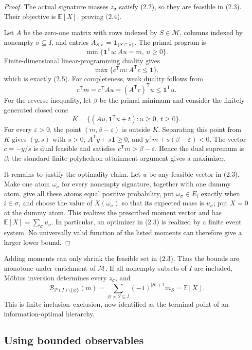 \documentclass[11pt]{article}
\theoremstyle{definition}
\theoremstyle{remark}
\newcommand{\E}{\mathbb E}
\newcommand{\one}{\mathbf 1}
\newcommand{\cP}{\mathcal P}
\newcommand{\cM}{\mathcal M}
\newcommand{\cB}{\mathcal B}
\begin{document}
\begin{proof}
The actual signature masses $z_\sigma$ satisfy (2.2), so they are feasible
in (2.3).  Their objective is $\E[X]$, proving (2.4).

Let $A$ be the zero-one matrix with rows indexed by $S\in\cM$, columns
indexed by nonempty $\sigma\subseteq I$, and entries
$A_{S,\sigma}=\one_{\{S\subseteq\sigma\}}$.  The primal program is
\[
 \min\{\mathbf1^{\mathsf T}u:Au=m,\ u\geq0\}.
\]
Finite-dimensional linear-programming duality gives
\[
 \max\{c^{\mathsf T}m:A^{\mathsf T}c\leq\mathbf1\},
\]
which is exactly (2.5).  For completeness, weak duality follows from
\[
 c^{\mathsf T}m=c^{\mathsf T}Au
 =(A^{\mathsf T}c)^{\mathsf T}u
 \leq\mathbf1^{\mathsf T}u.
\]
For the reverse inequality, let $\beta$ be the primal minimum and consider
the finitely generated closed cone
\[
 K=\{(Au,\mathbf1^{\mathsf T}u+t):u\geq0,\ t\geq0\}.
\]
For every $\varepsilon>0$, the point $(m,\beta-\varepsilon)$ is outside
$K$.  Separating this point from $K$ gives $(y,s)$ with $s>0$,
$A^{\mathsf T}y+s\mathbf1\geq0$, and
$y^{\mathsf T}m+s(\beta-\varepsilon)<0$.  The vector
$c=-y/s$ is dual feasible and satisfies
$c^{\mathsf T}m>\beta-\varepsilon$.  Hence the dual supremum is $\beta$;
the standard finite-polyhedron attainment argument gives a maximizer.

It remains to justify the optimality claim.  Let $u$ be any feasible
vector in (2.3).  Make one atom $\omega_\sigma$ for every nonempty
signature, together with one dummy atom, give all these atoms equal
positive probability, put $\omega_\sigma\in E_i$ exactly when
$i\in\sigma$, and choose the value of $X(\omega_\sigma)$ so that its
expected mass is $u_\sigma$; put $X=0$ at the dummy atom.  This realizes
the prescribed moment vector and has
$\E[X]=\sum_\sigma u_\sigma$.  In particular, an optimizer in (2.3) is
realized by a finite event system.  No universally valid function of the
listed moments can therefore give a larger lower bound.
\end{proof}

Adding moments can only shrink the feasible set in (2.3).  Thus the bounds
are monotone under enrichment of $\cM$.  If all nonempty subsets of $I$ are
included, M\"obius inversion determines every $z_\sigma$, and
\[
 \boxed{
 \cB_{\cP(I)\setminus\{\varnothing\}}(m)
 =\sum_{\varnothing\ne S\subseteq I}(-1)^{|S|+1}m_S
 =\E[X].}
 \tag{2.6}
\]
This is finite inclusion--exclusion, now identified as the terminal point
of an information-optimal hierarchy.

\subsection{Using bounded observables}
\end{document}

